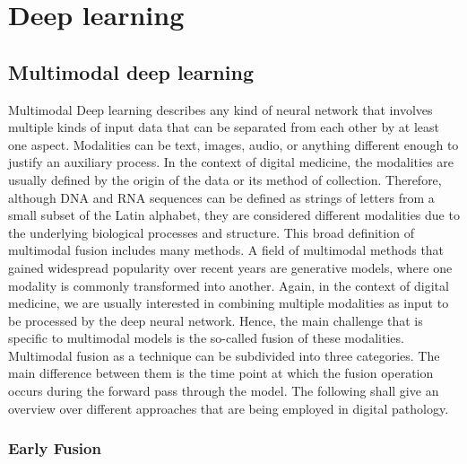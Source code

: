 \section{Deep learning}



\subsection{Multimodal deep learning}

Multimodal Deep learning describes any kind of neural network that involves multiple kinds of input data that can be separated from each other by at least one aspect. Modalities can be text, images, audio, or anything different enough to justify an auxiliary process. In the context of digital medicine, the modalities are usually defined by the origin of the data or its method of collection. Therefore, although DNA and RNA sequences can be defined as strings of letters from a small subset of the Latin alphabet, they are considered different modalities due to the underlying biological processes and structure.
This broad definition of multimodal fusion includes many methods. A field of multimodal methods that gained widespread popularity over recent years are generative models, where one modality is commonly transformed into another. Again, in the context of digital medicine, we are usually interested in combining multiple modalities as input to be processed by the deep neural network. Hence, the main challenge that is specific to multimodal models is the so-called fusion of these modalities.
Multimodal fusion as a technique can be subdivided into three categories. The main difference between them is the time point at which the fusion operation occurs during the forward pass through the model. The following shall give an overview over different approaches that are being employed in digital pathology.

\subsubsection{Early Fusion}


